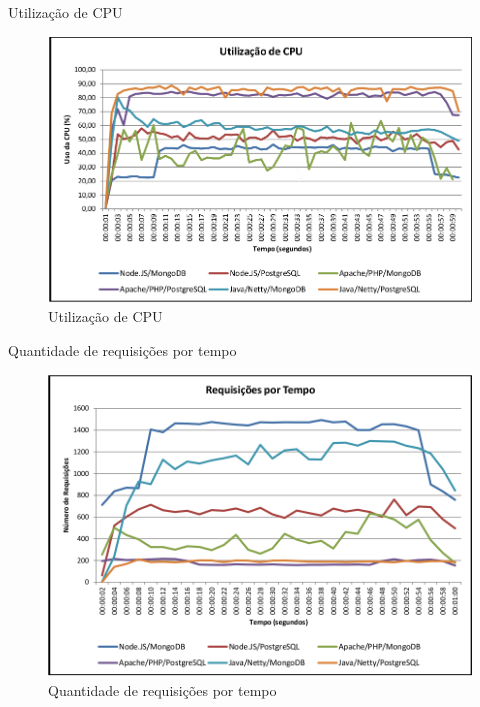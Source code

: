 \documentclass{beamer}
\begin{document}
\begin{frame}{Utilização de CPU}
\begin{figure}[hbt]
  \centering
  \includegraphics[scale=0.33]{../images/graf_cpu.png}
  \caption{Utilização de CPU}
  \label{fig: utilizacao_cpu}
  \end{figure}
\end{frame}

\begin{frame}{Quantidade de requisições por tempo}
\begin{figure}[hbt]
  \centering
  \includegraphics[scale=0.30]{../images/graf_req_tempo.png}
  \caption{Quantidade de requisições por tempo}
  \label{fig: req_tempo}
  \end{figure}
\end{frame}
\end{document}
